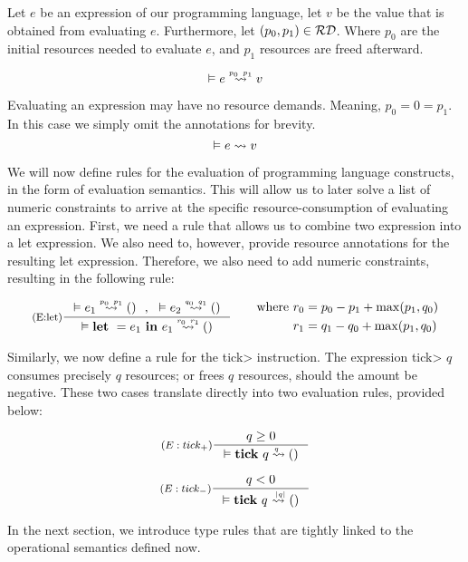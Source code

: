 \begin{definition}\label{def:evaluation-judgement}
   Let \(e\) be an expression of our programming language, let \(v\) be the value that is obtained from evaluating \(e\). Furthermore, let \((p_0, p_1) \in \mathcal{RD}\). 
   Where \(p_0\) are the initial resources needed to evaluate \(e\), and \(p_1\) resources are freed afterward.
   
   \[
      \evals{}{e}{v}{p_0}{p_1}
   \]
\end{definition}

\begin{remark}
   Evaluating an expression may have no resource demands. Meaning, \(p_0 = 0 = p_1\). In this case we simply omit the annotations for brevity. 
   \[
      \evals{}{e}{v}{}{}
   \]
\end{remark}

We will now define rules for the evaluation of programming language constructs, in the form of evaluation semantics. This will allow us to later solve a list of numeric constraints to arrive at the specific resource-consumption of evaluating an expression.
First, we need a rule that allows us to combine two expression into a let expression. We also need to, however, provide resource annotations for the resulting let expression. Therefore, we also need to add numeric constraints, resulting in the following rule:

\[
   \inference[(E:let)]
   {\evals{}{e_1}{()}{p_0}{p_1} ~~,~~ \evals{}{e_2}{()}{q_0}{q_1}}
   {\evals{}{\letexp{}{e_1}{e_1}}{()}{r_0}{r_1}}
   \qquad
   \begin{aligned}
      \text{where }  &r_0 = p_0 - p_1 + \max(p_1, q_0)\\
                     &r_1 = q_1 - q_0 + \max(p_1, q_0) 
   \end{aligned}
\]

Similarly, we now define a rule for the \<tick> instruction. The expression \<tick> \(q\) consumes precisely \(q\) resources; or frees \(q\) resources, should the amount be negative. These two cases translate directly into two evaluation rules, provided below:

\[
   \inference[\((E:tick_{+})\)]
   {q \geq 0}
   {\evals{}{\tick{q}}{()}{q}{}}
\]

\[
   \inference[\((E:tick_{-})\)]
   {q < 0}
   {\evals{}{\tick{q}}{()}{}{|q|}}
\]

In the next section, we introduce type rules that are tightly linked to the operational semantics defined now. 


